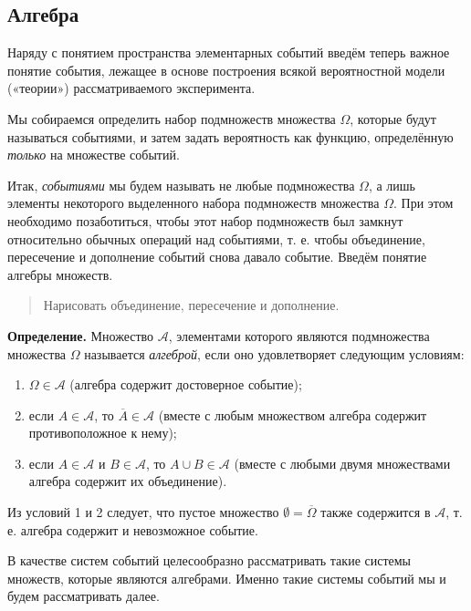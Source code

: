 \documentclass[11pt,a4paper]{article}
\providecommand{\tightlist}{%
      \setlength{\itemsep}{0pt}\setlength{\parskip}{0pt}}
\begin{document}
    \hypertarget{ux430ux43bux433ux435ux431ux440ux430}{%
\subsection{Алгебра}\label{ux430ux43bux433ux435ux431ux440ux430}}

Наряду с понятием пространства элементарных событий введём теперь важное
понятие события, лежащее в основе построения всякой вероятностной модели
(«теории») рассматриваемого эксперимента.

Мы собираемся определить набор подмножеств множества \(\Omega\), которые
будут называться событиями, и затем задать вероятность как функцию,
определённую \emph{только} на множестве событий.

Итак, \emph{событиями} мы будем называть не любые подмножества
\(\Omega\), а лишь элементы некоторого выделенного набора подмножеств
множества \(\Omega\). При этом необходимо позаботиться, чтобы этот набор
подмножеств был замкнут относительно обычных операций над событиями, т.
е. чтобы объединение, пересечение и дополнение событий снова давало
событие. Введём понятие алгебры множеств.

\begin{quote}
Нарисовать объединение, пересечение и дополнение.
\end{quote}

\textbf{Определение.} Множество \(\mathcal{A}\), элементами которого
являются подмножества множества \(\Omega\) называется \emph{алгеброй},
если оно удовлетворяет следующим условиям:

\begin{enumerate}
\def\labelenumi{\arabic{enumi}.}
\tightlist
\item
  \(\Omega \in \mathcal{A}\) (алгебра содержит достоверное событие);
\item
  если \(A \in \mathcal{A}\), то \(\overline{A} \in \mathcal{A}\)
  (вместе с любым множеством алгебра содержит противоположное к нему);
\item
  если \(A \in \mathcal{A}\) и \(B \in \mathcal{A}\), то
  \(A \cup B \in \mathcal{A}\) (вместе с любыми двумя множествами
  алгебра содержит их объединение).
\end{enumerate}

Из условий 1 и 2 следует, что пустое множество
\(\emptyset = \overline{\Omega}\) также содержится в \(\mathcal{A}\), т.
е. алгебра содержит и невозможное событие.

В качестве систем событий целесообразно рассматривать такие системы
множеств, которые являются алгебрами. Именно такие системы событий мы и
будем рассматривать далее.
\end{document}
